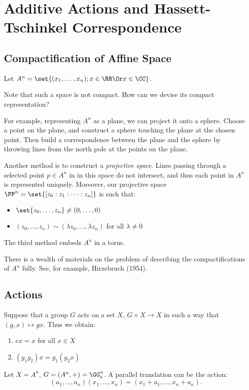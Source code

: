 \documentclass[11pt]{scrartcl}
\begin{document}
  \section{Additive Actions and Hassett-Tschinkel Correspondence}
  \subsection{Compactification of Affine Space}
  Let $A^{n} = \set{(x_{1}, \dots, x_{n}); x\in\RR \Or x\in\CC}$.

  Note that such a space is not compact. How can we devise its compact
  representation?

  For example, representing $A^{n}$ as a plane, we can project it onto
  a sphere. Choose a point on the plane, and construct a sphere
  touching the plane at the chosen point. Then build a correspondence
  between the plane and the sphere by throwing lines from the north
  pole at the points on the plane.

  Another method is to construct a \textit{projective space}. Lines
  passing through a selected point $p\in A^{n}$ in in this space do
  not intersect, and thus each point in $A^{n}$ is represented
  uniquely. Moreover, our projective space
  $\PP^{n} = \set{[z_{0}:z_{1}:\dots:z_{n}]}$ is such that:
  \begin{itemize}
  \item $\set{z_{0}, \dots, z_{n}} \neq (0, \dots, 0)$
  \item $(z_{0}, \dots, z_{n}) \sim (\lambda z_{0}, \dots, \lambda z_{n})$ for all $\lambda \neq 0$
  \end{itemize}

  The third method embeds $A^{n}$ in a torus.

  There is a wealth of materials on the problem of describing the
  compactifications of $A^{n}$ fully. See, for example, Hirzebruch
  (1954).
  
  \subsection{Actions}

  Suppose that a group $G$ acts on a set $X$, $G\times X \to X$ in
  such a way that $(g, x) \mapsto gx$. Thus we obtain:
  
  \begin{enumerate}
  \item $ex = x$ for all $x\in X$
  \item $(g_{1}g_{2})x = g_{1}(g_{2}x)$  
  \end{enumerate}
  \begin{example}

    Let $X = A^{n}$, $G=(A^{n}, +) = \GG_{a}^{n}$. A parallel
    translation can be the action:
    \begin{equation*}
      (a_{1}, \dots, a_{n})(x_{1}, \dots, x_{n}) = (x_{1} + a_{1}, \dots, x_{n} + a_{n}).
    \end{equation*}


  \end{example}
\end{document}
